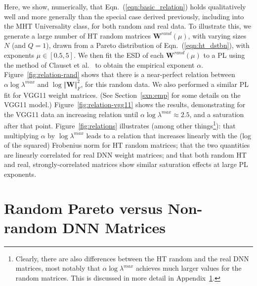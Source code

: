 {Here, we show, numerically, that Eqn.~(\ref{eqn:basic_relation}) holds qualitatively well and 
 more generally than the special case derived previously, including into the MHT Universality class, for both random and real data.
To illustrate this, we generate a large number of HT random matrices $\mathbf{W}^{rand}(\mu)$, with varying sizes $N$ (and $Q=1$), drawn from a Pareto distribution of Eqn.~(\ref{eqn:ht_dstbn}), with exponents $\mu\in[0.5, 5]$.
We then fit the ESD of each $\mathbf{W}^{rand}(\mu)$ to a PL using the method of Clauset et al.~\cite{CSN09_powerlaw,ABP14} to obtain the empirical exponent $\alpha$.   
Figure~\ref{fig:relation-rand} shows that there is a near-perfect relation between $ \alpha\log\lambda^{max}$ and $\log\Vert\mathbf{W}\Vert^{2}_{F} $, for this random data.
We also performed a similar PL fit for VGG11 weight matrices.
(See Section~\ref{sxn:emp} for some details on the VGG11 model.)
Figure~\ref{fig:relation-vgg11} shows the results, demonstrating for the VGG11 data an increasing relation until $ \alpha\log\lambda^{max} \approx 2.5$, and a saturation after that point.
Figure~\ref{fig:relations} illustrates
(among other things\footnote{Clearly, there are also differences between the HT random and the real DNN matrices, most notably that $ \alpha\log\lambda^{max} $ achieves much larger values for the random matrices.  This is discussed in more detail in Appendix~\ref{sxn:appendix-universality}.}):
that multiplying $\alpha$ by $\log\lambda^{max}$ leads to a relation that increases linearly with the (log of the squared) Frobenius norm for HT random matrices; that the two quantities are linearly correlated for real DNN weight matrices; and that both random HT and real, strongly-correlated matrices show similar saturation effects at large PL exponents.




\section{Random Pareto versus Non-random DNN Matrices} 
\label{sxn:appendix-universality}

}
